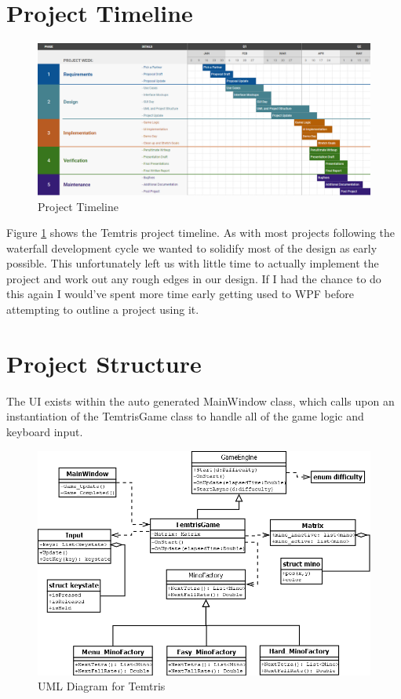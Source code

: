 \documentclass[10pt,conference,onecolumn,compsoc]{IEEEtran}
\begin{document}
\section{Project Timeline}
\begin{figure}[!h]
\centering
\includegraphics[scale=.45]{Timeline.png}
\caption{Project Timeline}
\label{fig:timeline}
\end{figure}

Figure \ref{fig:timeline} shows the Temtris project timeline. As with most projects following the waterfall development cycle we wanted to solidify most of the design as early possible. This unfortunately left us with little time to actually implement the project and work out any rough edges in our design. If I had the chance to do this again I would've spent more time early getting used to WPF before attempting to outline a project using it. 

\section{Project Structure}
The UI exists within the auto generated MainWindow class, which calls upon an instantiation of the TemtrisGame class to handle all of the game logic and keyboard input.

\begin{figure}[!h]
\centering
\includegraphics[scale=0.4]{ClassDiagrams.png}
\caption{UML Diagram for Temtris}
\label{fig:uml}
\end{figure}
\end{document}
